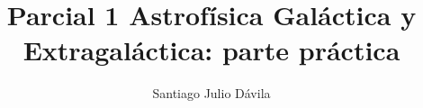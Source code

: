 \documentclass[final,5p,times,twocolumn, nopreprintline]{elsarticle}
\numberwithin{equation}{section}
\begin{document}
\begin{frontmatter}



\title{Parcial 1 Astrofísica Galáctica y Extragaláctica: parte práctica}


\author[first]{Santiago Julio Dávila}


\begin{abstract}

\end{abstract}




\end{frontmatter}
\end{document}
